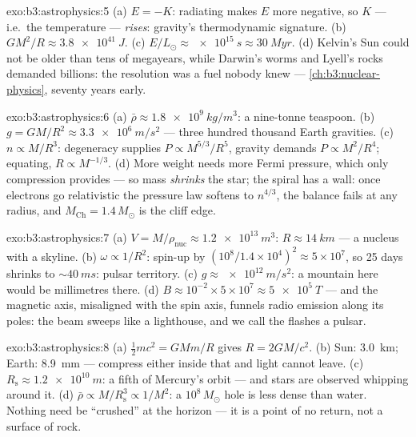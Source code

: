\begin{solution}{exo:b3:astrophysics:5}
(a) $E = -K$: radiating makes $E$ more negative, so $K$ ---
i.e.\ the temperature --- \emph{rises}: gravity's thermodynamic
signature. (b) $GM^2/R \approx \qty{3.8e41}{J}$. (c)
$E/L_\odot \approx \qty{e15}{s} \approx \qty{30}{Myr}$. (d)
Kelvin's Sun could not be older than tens of megayears, while
Darwin's worms and Lyell's rocks demanded billions: the
resolution was a fuel nobody knew --- \cref{ch:b3:nuclear-physics},
seventy years early.
\end{solution}

\begin{solution}{exo:b3:astrophysics:6}
(a) $\bar\rho \approx \qty{1.8e9}{kg/m^3}$: a nine-tonne
teaspoon. (b) $g = GM/R^2 \approx \qty{3.3e6}{m/s^2}$ --- three
hundred thousand Earth gravities. (c) $n \propto M/R^3$:
degeneracy supplies $P \propto M^{5/3}/R^5$, gravity demands
$P \propto M^2/R^4$; equating, $R \propto M^{-1/3}$. (d) More
weight needs more Fermi pressure, which only compression
provides --- so mass \emph{shrinks} the star; the spiral has a
wall: once electrons go relativistic the pressure law softens to
$n^{4/3}$, the balance fails at any radius, and
$M_{\text{Ch}} = 1.4\,M_\odot$ is the cliff edge.
\end{solution}

\begin{solution}{exo:b3:astrophysics:7}
(a) $V = M/\rho_{\text{nuc}} \approx \qty{1.2e13}{m^3}$:
$R \approx \qty{14}{km}$ --- a nucleus with a skyline. (b)
$\omega \propto 1/R^2$: spin-up by $(10^8/1.4\times10^4)^2
\approx 5\times10^{7}$, so 25 days shrinks to
${\sim}\qty{40}{ms}$: pulsar territory. (c) $g \approx
\qty{e12}{m/s^2}$: a mountain here would be millimetres there.
(d) $B \approx 10^{-2}\times5\times10^{7} \approx
\qty{5e5}{T}$ --- and the magnetic axis, misaligned with the
spin axis, funnels radio emission along its poles: the beam
sweeps like a lighthouse, and we call the flashes a pulsar.
\end{solution}

\begin{solution}{exo:b3:astrophysics:8}
(a) $\tfrac12mc^2 = GMm/R$ gives $R = 2GM/c^2$. (b) Sun:
\qty{3.0}{km}; Earth: \qty{8.9}{mm} --- compress either inside
that and light cannot leave. (c) $R_{\text{s}} \approx
\qty{1.2e10}{m}$: a fifth of Mercury's orbit --- and stars are
observed whipping around it. (d) $\bar\rho \propto
M/R_{\text{s}}^3 \propto 1/M^2$: a $10^8\,M_\odot$ hole is less
dense than water. Nothing need be ``crushed'' at the horizon ---
it is a point of no return, not a surface of rock.
\end{solution}

